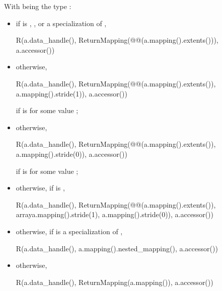 \begin{itemdescr}
\pnum
\returns
With  being
the type :
\begin{itemize}
\item
if  is , , or
a specialization of ,
\begin{codeblock}
R(a.data_handle(), ReturnMapping(@@(a.mapping().extents())),
  a.accessor())
\end{codeblock}
\item
otherwise,
\begin{codeblock}
R(a.data_handle(), ReturnMapping(@@(a.mapping().extents()),
  a.mapping().stride(1)), a.accessor())
\end{codeblock}
if  is 
for some  value ;
\item
otherwise,
\begin{codeblock}
R(a.data_handle(), ReturnMapping(@@(a.mapping().extents()),
  a.mapping().stride(0)), a.accessor())
\end{codeblock}
if  is 
for some  value ;
\item
otherwise, if  is ,
\begin{codeblock}
R(a.data_handle(), ReturnMapping(@@(a.mapping().extents()),
  array{a.mapping().stride(1), a.mapping().stride(0)}), a.accessor())
\end{codeblock}
\item
otherwise, if  is a specialization of ,
\begin{codeblock}
R(a.data_handle(), a.mapping().nested_mapping(), a.accessor())
\end{codeblock}
\item
otherwise,
\begin{codeblock}
R(a.data_handle(), ReturnMapping(a.mapping()), a.accessor())
\end{codeblock}
\end{itemize}
\end{itemdescr}

